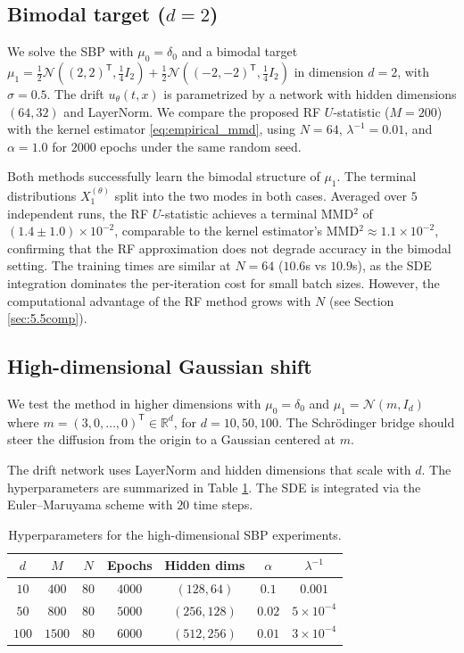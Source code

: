\documentclass[11pt,leqno]{article}
\theoremstyle{plain}
\theoremstyle{remark}
\theoremstyle{definition}
\numberwithin{equation}{section}
\numberwithin{figure}{section}
\numberwithin{table}{section}
\numberwithin{algorithm}{section}
\newcommand{\RR}{\mathbb{R}}
\begin{document}
\subsection{Bimodal target ($d=2$)}\label{sec:5.2}

We solve the SBP with $\mu_0=\delta_0$ and a bimodal target
$\mu_1 = \frac{1}{2}\mathcal{N}((2,2)^{\mathsf{T}}, \frac{1}{4} I_2)
        + \frac{1}{2}\mathcal{N}((-2,-2)^{\mathsf{T}}, \frac{1}{4} I_2)$
in dimension $d=2$, with $\sigma=0.5$.
The drift $u_\theta(t,x)$ is parametrized by a network with hidden dimensions $(64,32)$ and LayerNorm.
We compare the proposed RF $U$-statistic ($M=200$) with the kernel estimator \eqref{eq:empirical_mmd},
using $N=64$, $\lambda^{-1}=0.01$, and $\alpha=1.0$ for $2000$ epochs under the same random seed.

Both methods successfully learn the bimodal structure of $\mu_1$.
The terminal distributions $X_1^{(\theta)}$ split into the two modes in both cases.
Averaged over $5$ independent runs, the RF $U$-statistic achieves a terminal MMD${}^2$ of
$(1.4\pm 1.0)\times 10^{-2}$, comparable to the kernel estimator's MMD${}^2 \approx 1.1\times 10^{-2}$,
confirming that the RF approximation does not degrade accuracy in the bimodal setting.
The training times are similar at $N=64$ ($10.6$s vs $10.9$s),
as the SDE integration dominates the per-iteration cost for small batch sizes.
However, the computational advantage of the RF method grows with $N$
(see Section \ref{sec:5.5comp}).


\subsection{High-dimensional Gaussian shift}\label{sec:5.3}

We test the method in higher dimensions with $\mu_0=\delta_0$ and
$\mu_1=\mathcal{N}(m, I_d)$ where $m=(3,0,\ldots,0)^{\mathsf{T}}\in\RR^d$, for $d=10, 50, 100$.
The Schr{\"o}dinger bridge should steer the diffusion from the origin to a Gaussian centered at $m$.

The drift network uses LayerNorm and hidden dimensions that scale with $d$. 
The hyperparameters are summarized in Table \ref{tab:sbp_config}.
The SDE is integrated via the Euler--Maruyama scheme with $20$ time steps.

\begin{table}[htbp]
\centering
\caption{Hyperparameters for the high-dimensional SBP experiments.}
\label{tab:sbp_config}
\begin{tabular}{ccccccc}
\toprule
$d$ & $M$ & $N$ & Epochs & Hidden dims & $\alpha$ & $\lambda^{-1}$ \\
\midrule
$10$  & $400$  & $80$ & $4000$ & $(128,64)$ & $0.1$  & $0.001$ \\
$50$  & $800$  & $80$ & $5000$ & $(256,128)$ & $0.02$ & $5\times 10^{-4}$ \\
$100$ & $1500$ & $80$ & $6000$ & $(512,256)$ & $0.01$ & $3\times 10^{-4}$ \\
\bottomrule
\end{tabular}
\end{table}
\end{document}
